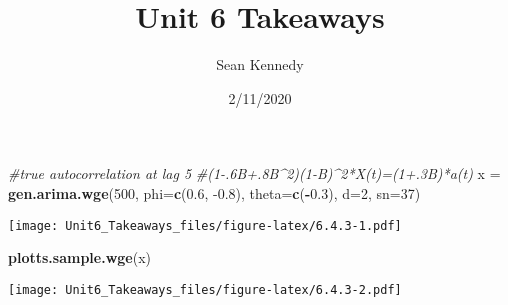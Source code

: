 \documentclass[
]{article}
\title{Unit 6 Takeaways}
\author{Sean Kennedy}
\date{2/11/2020}
\newenvironment{Shaded}{\begin{snugshade}}{\end{snugshade}}
\newcommand{\CommentTok}[1]{\textcolor[rgb]{0.56,0.35,0.01}{\textit{#1}}}
\newcommand{\DataTypeTok}[1]{\textcolor[rgb]{0.13,0.29,0.53}{#1}}
\newcommand{\DecValTok}[1]{\textcolor[rgb]{0.00,0.00,0.81}{#1}}
\newcommand{\FloatTok}[1]{\textcolor[rgb]{0.00,0.00,0.81}{#1}}
\newcommand{\KeywordTok}[1]{\textcolor[rgb]{0.13,0.29,0.53}{\textbf{#1}}}
\newcommand{\NormalTok}[1]{#1}
\newcommand{\OperatorTok}[1]{\textcolor[rgb]{0.81,0.36,0.00}{\textbf{#1}}}
\newcommand{\StringTok}[1]{\textcolor[rgb]{0.31,0.60,0.02}{#1}}
\begin{document}
\maketitle

\begin{Shaded}
\begin{Highlighting}[]
\CommentTok{#true autocorrelation at lag 5}
\CommentTok{#(1-.6B+.8B^2)(1-B)^2*X(t)=(1+.3B)*a(t)}
\NormalTok{x =}\StringTok{ }\KeywordTok{gen.arima.wge}\NormalTok{(}\DecValTok{500}\NormalTok{, }\DataTypeTok{phi=}\KeywordTok{c}\NormalTok{(}\FloatTok{0.6}\NormalTok{, }\FloatTok{-0.8}\NormalTok{), }\DataTypeTok{theta=}\KeywordTok{c}\NormalTok{(}\OperatorTok{-}\FloatTok{0.3}\NormalTok{), }\DataTypeTok{d=}\DecValTok{2}\NormalTok{, }\DataTypeTok{sn=}\DecValTok{37}\NormalTok{)}
\end{Highlighting}
\end{Shaded}

\texttt{[image: Unit6\_Takeaways\_files/figure-latex/6.4.3-1.pdf]}

\begin{Shaded}
\begin{Highlighting}[]
\KeywordTok{plotts.sample.wge}\NormalTok{(x)}
\end{Highlighting}
\end{Shaded}

\texttt{[image: Unit6\_Takeaways\_files/figure-latex/6.4.3-2.pdf]}
\end{document}
